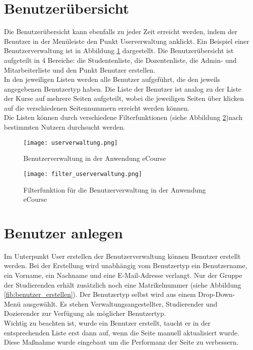 \section{Benutzerübersicht}
Die Benutzerübersicht kann ebenfalls zu jeder Zeit erreicht werden, indem der Benutzer in der Menüleiste den Punkt \glqq Userverwaltung\grqq{} anklickt. Ein Beispiel einer Benutzerverwaltung ist in Abbildung \ref{fib:userverwaltung} dargestellt.
Die Benutzerübersicht ist aufgeteilt in 4 Bereiche: die Studentenliste, die Dozentenliste, die Admin- und Mitarbeiterliste und den Punkt Benutzer erstellen. \\
In den jeweiligen Listen werden alle Benutzer aufgeführt, die den jeweils angegebenen Benutzertyp haben. Die Liste der Benutzer ist analog zu der Liste der Kurse auf mehrere Seiten aufgeteilt, wobei die jeweiligen Seiten über klicken auf die verschiedenen Seitennummern erreicht werden können.\\
Die Listen können durch verschiedene Filterfunktionen (siehe Abbildung \ref{fib:filter})nach bestimmten Nutzern durchsucht werden. 
\begin{figure}[h]
\centering
\texttt{[image: userverwaltung.png]}
\caption{Benutzerverwaltung in der Anwendung eCourse}
\label{fib:userverwaltung}
\end{figure}

\begin{figure}[h]
\centering
\texttt{[image: filter\_userverwaltung.png]}
\caption{Filterfunktion für die Benutzerverwaltung in der Anwendung eCourse}
\label{fib:filter}
\end{figure}


\section{Benutzer anlegen}
Im Unterpunkt \glqq User erstellen\grqq\: der Benutzerverwaltung können Benutzer erstellt werden. Bei der Erstellung wird unabhängig vom Benutzertyp ein Benutzername, ein Vorname, ein Nachname und eine E-Mail-Adresse verlangt. Nur der Gruppe der Studierenden erhält zusätzlich noch eine Matrikelnummer (siehe Abbildung \ref{fib:benutzer_erstellen}). Der Benutzertyp selbst wird aus einem Drop-Down-Menü ausgewählt. Es stehen Verwaltungsangestellter, Studierender und Dozierender zur Verfügung als möglicher Benutzertyp. \\
Wichtig zu beachten ist, wurde ein Benutzer erstellt, taucht er in der entsprechenden Liste erst dann auf, wenn die Seite manuell aktualisiert wurde. Diese Maßnahme wurde eingebaut um die Performanz der Seite zu verbessern.

